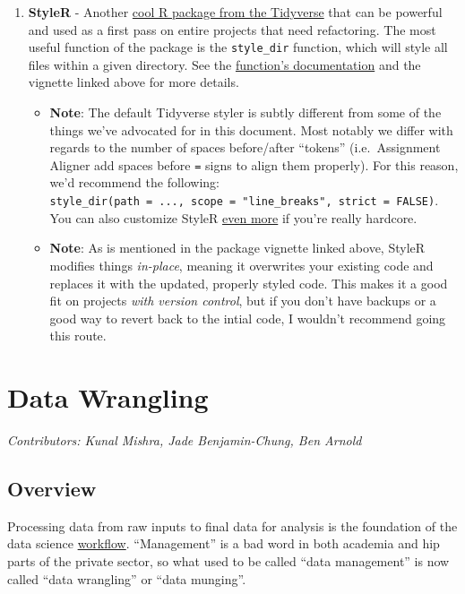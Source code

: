 \documentclass[
]{book}
\providecommand{\tightlist}{%
  \setlength{\itemsep}{0pt}\setlength{\parskip}{0pt}}
\begin{document}
\begin{enumerate}
\def\labelenumi{\arabic{enumi}.}
\setcounter{enumi}{2}
\tightlist
\item
  \textbf{StyleR} - Another \href{https://www.tidyverse.org/articles/2017/12/styler-1.0.0/}{cool R package from the Tidyverse} that can be powerful and used as a first pass on entire projects that need refactoring. The most useful function of the package is the \texttt{style\_dir} function, which will style all files within a given directory. See the \href{https://www.rdocumentation.org/packages/styler/versions/1.1.0/topics/style_dir}{function's documentation} and the vignette linked above for more details.

  \begin{itemize}
  \tightlist
  \item
    \textbf{Note}: The default Tidyverse styler is subtly different from some of the things we've advocated for in this document. Most notably we differ with regards to the number of spaces before/after ``tokens'' (i.e.~Assignment Aligner add spaces before \texttt{=} signs to align them properly). For this reason, we'd recommend the following: \texttt{style\_dir(path\ =\ ...,\ scope\ =\ "line\_breaks",\ strict\ =\ FALSE)}. You can also customize StyleR \href{http://styler.r-lib.org/articles/customizing_styler.html}{even more} if you're really hardcore.
  \item
    \textbf{Note}: As is mentioned in the package vignette linked above, StyleR modifies things \emph{in-place}, meaning it overwrites your existing code and replaces it with the updated, properly styled code. This makes it a good fit on projects \emph{with version control}, but if you don't have backups or a good way to revert back to the intial code, I wouldn't recommend going this route.
  \end{itemize}
\end{enumerate}

\chapter{Data Wrangling}\label{datawrangling}

\emph{Contributors: Kunal Mishra, Jade Benjamin-Chung, Ben Arnold}

\section{Overview}\label{overview}

Processing data from raw inputs to final data for analysis is the foundation of the data science \hyperref[workflows]{workflow}. ``Management'' is a bad word in both academia and hip parts of the private sector, so what used to be called ``data management'' is now called ``data wrangling'' or ``data munging''.
\end{document}
